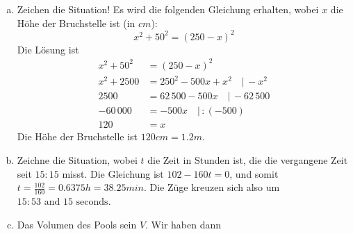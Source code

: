 \documentclass[%
11pt,%
twoside,%
titlepage,%
german,%
headsepline%
]{scrartcl}
\begin{document}
{\begin{enumerate}[a)]
                                Die Gleichung ist wie folgt, wobei $x$ die original Stufenhöhe ist: $${20  (x+1.6) = 22x}$$ Auflösen nach $x$:
                                \begin{align*}
                                20  (x+1.6) & = 22x \\
                                20x+32 & = 22x \quad | \, -20x\\
                                32 & = 2x \quad | \, :2\\
                                {16} & =x 
                                \end{align*}
                                Die originale Stufenhöhe ist also $16 cm$.
                                \item Zeichen die Situation!
                                Es wird die folgenden Gleichung erhalten, wobei $x$ die Höhe der Bruchstelle ist (in $cm$): $${x^2+50^2 = (250-x)^2}$$ Die Lösung ist
                                \begin{align*}
                                x^2+50^2 & = (250-x)^2 \\
                                x^2+2500 & = 250^2-500x+x^2 \quad | \, -x^2\\
                                2500 & = 62\,500-500x \quad | \, -62\,500\\
                                -60\,000 & = -500x \quad | \, : (-500)\\
                                {120} & =x 
                                \end{align*}
                                Die Höhe der Bruchstelle ist $120 cm=1.2 m$.
                                \item Zeichne die Situation, wobei $t$ die Zeit in Stunden ist, die die vergangene Zeit seit $15:15$ misst.  %
                                Die Gleichung ist ${102-160 t = 0}$, und somit $t=\frac{102}{160}=0.6375 h = 38.25 min$. Die Züge kreuzen sich also um ${15:53 \mbox{ and } 15 \mbox{ seconds}}$.
                                \item Das Volumen des Pools sein $V$. Wir haben dann\\
                                \begin{tabular}{lllllll}

\end{tabular}
\end{enumerate}}
\end{document}
